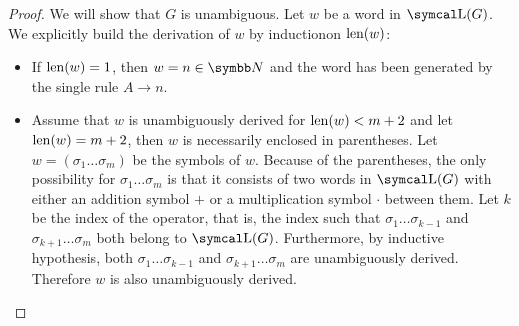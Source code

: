 \begin{proof}
  We will show that \( G \) is unambiguous. Let \( w \) be a word in \( \CL(G) \). We explicitly build the derivation of \( w \) by induction\IND on \( \operatorname{len}(w) \):
  \begin{itemize}
    \item If \( \operatorname{len}(w) = 1 \), then \( w = n \in \BN \) and the word has been generated by the single rule \( A \to n \).

    \item Assume that \( w \) is unambiguously derived for \( \operatorname{len}(w) < m + 2 \) and let \( \operatorname{len}(w) = m + 2 \), then \( w \) is necessarily enclosed in parentheses. Let \( w = ( \sigma_1 \ldots \sigma_m ) \) be the symbols of \( w \). Because of the parentheses, the only possibility for \( \sigma_1 \ldots \sigma_m \) is that it consists of two words in \( \CL(G) \) with either an addition symbol \( + \) or a multiplication symbol \( \cdot \) between them. Let \( k \) be the index of the operator, that is, the index such that \( \sigma_1 \ldots \sigma_{k-1} \) and \( \sigma_{k+1} \ldots \sigma_m \) both belong to \( \CL(G) \). Furthermore, by inductive hypothesis, both \( \sigma_1 \ldots \sigma_{k-1} \) and \( \sigma_{k+1} \ldots \sigma_m \) are unambiguously derived. Therefore \( w \) is also unambiguously derived.
  \end{itemize}
\end{proof}
